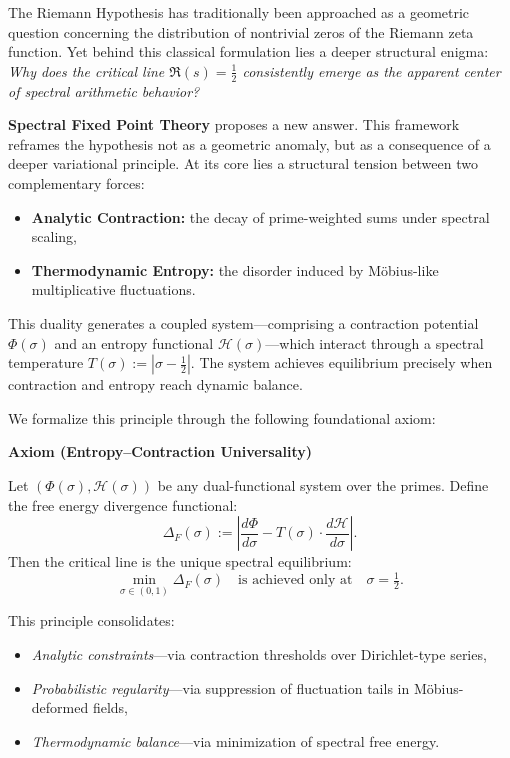 \documentclass[12pt]{article}
\begin{document}
\vspace{1em}

The Riemann Hypothesis has traditionally been approached as a geometric question concerning the distribution of nontrivial zeros of the Riemann zeta function. Yet behind this classical formulation lies a deeper structural enigma: \emph{Why does the critical line $\Re(s) = \tfrac{1}{2}$ consistently emerge as the apparent center of spectral arithmetic behavior?}

\smallskip

\textbf{Spectral Fixed Point Theory} proposes a new answer. This framework reframes the hypothesis not as a geometric anomaly, but as a consequence of a deeper variational principle. At its core lies a structural tension between two complementary forces:

\begin{itemize}
    \item \textbf{Analytic Contraction:} the decay of prime-weighted sums under spectral scaling,
    \item \textbf{Thermodynamic Entropy:} the disorder induced by Möbius-like multiplicative fluctuations.
\end{itemize}

This duality generates a coupled system—comprising a contraction potential $\Phi(\sigma)$ and an entropy functional $\mathcal{H}(\sigma)$—which interact through a spectral temperature $T(\sigma) := |\sigma - \tfrac{1}{2}|$. The system achieves equilibrium precisely when contraction and entropy reach dynamic balance.

\medskip

We formalize this principle through the following foundational axiom:

\begin{center}
    \large\textbf{Axiom (Entropy–Contraction Universality)}
\end{center}

\noindent Let $(\Phi(\sigma), \mathcal{H}(\sigma))$ be any dual-functional system over the primes. Define the free energy divergence functional:
\[
\Delta_F(\sigma) := \left| \frac{d\Phi}{d\sigma} - T(\sigma) \cdot \frac{d\mathcal{H}}{d\sigma} \right|.
\]
Then the critical line is the unique spectral equilibrium:
\[
\min_{\sigma \in (0,1)} \Delta_F(\sigma) \quad \text{is achieved only at} \quad \sigma = \tfrac{1}{2}.
\]

\smallskip

This principle consolidates:
\begin{itemize}
    \item \emph{Analytic constraints}—via contraction thresholds over Dirichlet-type series,
    \item \emph{Probabilistic regularity}—via suppression of fluctuation tails in Möbius-deformed fields,
    \item \emph{Thermodynamic balance}—via minimization of spectral free energy.
\end{itemize}
\end{document}
